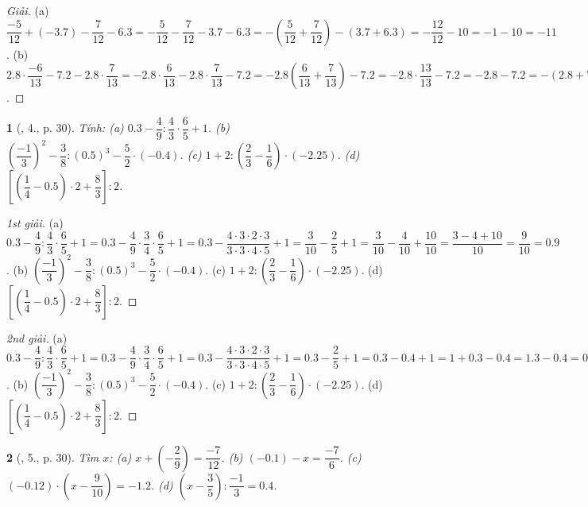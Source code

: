 \documentclass{article}
\newtheorem{baitoan}{}
\begin{document}
\begin{proof}[Giải]
	(a) $\dfrac{-5}{12} + (-3.7) - \dfrac{7}{12} - 6.3 = -\dfrac{5}{12} - \dfrac{7}{12} - 3.7 - 6.3 = -\left(\dfrac{5}{12} + \dfrac{7}{12}\right) - (3.7 + 6.3) = -\dfrac{12}{12} - 10 = -1 - 10 = -11$. (b) $2.8\cdot\dfrac{-6}{13} - 7.2 - 2.8\cdot\dfrac{7}{13} = -2.8\cdot\dfrac{6}{13} - 2.8\cdot\dfrac{7}{13} - 7.2 = -2.8\left(\dfrac{6}{13} +\dfrac{7}{13}\right) - 7.2 = -2.8\cdot\dfrac{13}{13} - 7.2 = -2.8 - 7.2 = -(2.8 + 7.2) = -10$.
\end{proof}

\begin{baitoan}[\cite{SGK_Toan_7_Canh_Dieu_tap_1}, 4., p. 30]
	Tính: (a) $0.3 - \dfrac{4}{9}:\dfrac{4}{3}\cdot\dfrac{6}{5} + 1$. (b) $\left(\dfrac{-1}{3}\right)^2 - \dfrac{3}{8}:(0.5)^3 - \dfrac{5}{2}\cdot(-0.4)$. (c) $1 + 2:\left(\dfrac{2}{3} - \dfrac{1}{6}\right)\cdot(-2.25)$. (d) $\left[\left(\dfrac{1}{4} - 0.5\right)\cdot2 + \dfrac{8}{3}\right]:2$.
\end{baitoan}

\begin{proof}[1st giải]
	(a) $0.3 - \dfrac{4}{9}:\dfrac{4}{3}\cdot\dfrac{6}{5} + 1 = 0.3 - \dfrac{4}{9}\cdot\dfrac{3}{4}\cdot\dfrac{6}{5} + 1 = 0.3 - \dfrac{4\cdot3\cdot2\cdot3}{3\cdot3\cdot4\cdot5} + 1 = \dfrac{3}{10} - \dfrac{2}{5} + 1 = \dfrac{3}{10} - \dfrac{4}{10} + \dfrac{10}{10} = \dfrac{3 - 4 + 10}{10} = \dfrac{9}{10} = 0.9$. (b) $\left(\dfrac{-1}{3}\right)^2 - \dfrac{3}{8}:(0.5)^3 - \dfrac{5}{2}\cdot(-0.4)$. (c) $1 + 2:\left(\dfrac{2}{3} - \dfrac{1}{6}\right)\cdot(-2.25)$. (d) $\left[\left(\dfrac{1}{4} - 0.5\right)\cdot2 + \dfrac{8}{3}\right]:2$.
\end{proof}

\begin{proof}[2nd giải]
	(a) $0.3 - \dfrac{4}{9}:\dfrac{4}{3}\cdot\dfrac{6}{5} + 1 = 0.3 - \dfrac{4}{9}\cdot\dfrac{3}{4}\cdot\dfrac{6}{5} + 1 = 0.3 - \dfrac{4\cdot3\cdot2\cdot3}{3\cdot3\cdot4\cdot5} + 1 = 0.3 - \dfrac{2}{5} + 1 = 0.3 - 0.4 + 1 = 1 + 0.3 - 0.4 = 1.3 - 0.4 = 0.9$. (b) $\left(\dfrac{-1}{3}\right)^2 - \dfrac{3}{8}:(0.5)^3 - \dfrac{5}{2}\cdot(-0.4)$. (c) $1 + 2:\left(\dfrac{2}{3} - \dfrac{1}{6}\right)\cdot(-2.25)$. (d) $\left[\left(\dfrac{1}{4} - 0.5\right)\cdot2 + \dfrac{8}{3}\right]:2$.
\end{proof}

\begin{baitoan}[\cite{SGK_Toan_7_Canh_Dieu_tap_1}, 5., p. 30]
	Tìm $x$: (a) $x + \left(-\dfrac{2}{9}\right) = \dfrac{-7}{12}$. (b) $(-0.1) - x = \dfrac{-7}{6}$. (c) $(-0.12)\cdot\left(x - \dfrac{9}{10}\right) = -1.2$. (d) $\left(x - \dfrac{3}{5}\right):\dfrac{-1}{3} = 0.4$.
\end{baitoan}
\end{document}
